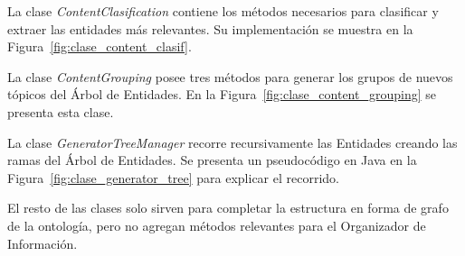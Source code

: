 La clase \emph{ContentClasification} contiene los métodos necesarios para clasificar y extraer las entidades más relevantes. Su implementación se muestra en la Figura~\ref{fig:clase_content_clasif}.

La clase \emph{ContentGrouping} posee tres métodos para generar los grupos de nuevos tópicos del Árbol de Entidades. En la Figura~\ref{fig:clase_content_grouping} se presenta esta clase.

La clase \emph{GeneratorTreeManager} recorre recursivamente las Entidades creando las ramas del Árbol de Entidades. Se presenta un pseudocódigo en Java en la Figura~\ref{fig:clase_generator_tree} para explicar el recorrido.

El resto de las clases solo sirven para completar la estructura en forma de grafo de la ontología, pero no agregan métodos relevantes para el Organizador de Información.


